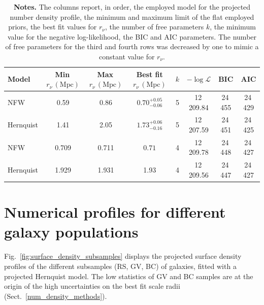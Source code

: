 \documentclass{aa}
\begin{document}
\begin{table}
\centering
\caption{MG-MAMPOSSt priors and results for changes on tracer numerical density models.}
\renewcommand{\arraystretch}{1.3} %
\begin{tabular}{lccccccc}
\hline
{Model} & {Min}\,$r_\nu \, (\mathrm{Mpc})$ & {Max}\,${r_\nu \, (\mathrm{Mpc})}$ & {Best fit} ${r_\nu \, (\mathrm{Mpc})}$ & ${k}$ & ${-\log\mathcal{L}}$ & {BIC} & {AIC} \\
\hline
NFW  & 0.59 & 0.86 & $0.70^{+0.05}_{-0.06}$  & 5 & 12\,209.84  & 24\,455 & 24\,429 \\
Hernquist  & 1.41 & 2.05 & $1.73^{+0.06}_{-0.16}$  & 5 & 12\,207.59  & 24\,451 & 24\,425 \\
NFW   & 0.709 & 0.711  & $0.71$  & 4 & 12\,209.78  & 24\,448 & 24\,427 \\
Hernquist & 1.929 & 1.931 & 1.93 & 4 & 12\,209.56 & 24\,447 & 24\,427 \\
\hline
\end{tabular}
\caption*{\footnotesize \textbf{Notes.} %
The columns report, in order, the employed model for the projected number density profile, the minimum and maximum limit of the flat employed priors, the best fit values for $r_\nu$, the number of free parameters $k$, the minimum value for the negative log-likelihood, the BIC and AIC parameters. The number of free parameters for the third and fourth rows was decreased by one to mimic a constant value for $r_\nu$.}
\label{tab:model_comparison}
\end{table}



\section{Numerical profiles for different galaxy populations}
\label{app:B}

Fig.~\ref{fig:surface_density_subsamples} displays the projected surface density profiles of the different subsamples (RS, GV, BC) of galaxies, fitted with a projected Hernquist model. The low statistics of GV and BC samples are at the origin of the high uncertainties on the best fit scale radii (Sect.~\ref{num_density_methods}).

\end{document}
